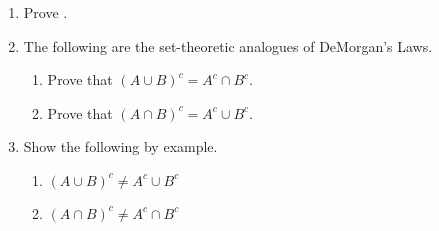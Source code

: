 \begin{enumerate}
    \item Prove .

    \item The following are the set-theoretic analogues of DeMorgan's Laws.
  \begin{enumerate}
      \item Prove that $(A \cup B)^c = A^c \cap B^c$.
      \item Prove that $(A \cap B)^c = A^c \cup B^c$.
  \end{enumerate}

    \item Show the following by example.
  \begin{enumerate}
      \item $(A \cup B)^c \neq A^c \cup B^c$ 
      \item $(A \cap B)^c \neq A^c \cap B^c$
  \end{enumerate}
\end{enumerate}
